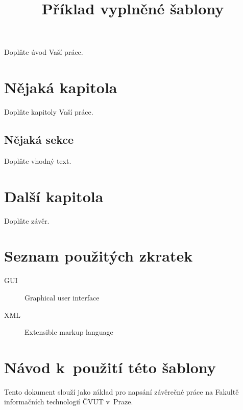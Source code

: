 \documentclass[thesis=B,czech]{FITthesis}[2012/10/20]
\title{Příklad vyplněné šablony}
\begin{document}

\begin{introduction}
	Doplňte úvod Vaší práce.
\end{introduction}

\chapter{Nějaká kapitola}

Doplňte kapitoly Vaší práce.

\section{Nějaká sekce}

Doplňte vhodný text.

\chapter{Další kapitola}


\begin{conclusion}
	Doplňte závěr.
\end{conclusion}




\appendix

\chapter{Seznam použitých zkratek}
\begin{description}
	\item[GUI] Graphical user interface
	\item[XML] Extensible markup language
\end{description}



\chapter{Návod k~použití této šablony}

Tento dokument slouží jako základ pro napsání závěrečné práce na Fakultě informačních technologií ČVUT v~Praze.
\end{document}
